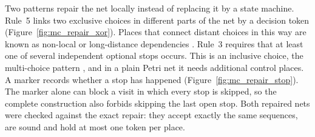 
Two patterns repair the net locally instead of replacing it by a state
machine. Rule~5 links two exclusive choices in different parts of the net by a
decision token (Figure~\ref{fig:mc_repair_xor}). Places that connect distant
choices in this way are known as non-local or long-distance dependencies
\cite{Wen2007AlphaPlusPlus,RWKalenkova2020NonLocal}. Rule~3 requires that at
least one of several independent optional stops occurs. This is an inclusive
choice, the multi-choice pattern \cite{Russell2006WorkflowPatterns}, and in a
plain Petri net it needs additional control places. A marker records whether a
stop has happened (Figure~\ref{fig:mc_repair_stop}). The marker alone can block
a visit in which every stop is skipped, so the complete construction also
forbids skipping the last open stop. Both repaired nets were checked against the
exact repair: they accept exactly the same sequences, are sound and hold at
most one token per place.

